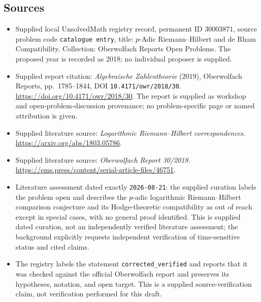 \documentclass[11pt]{article}
\begin{document}
\subsection{Sources}
\begin{itemize}
\item Supplied local UnsolvedMath registry record, permanent ID \(30003871\), source problem code \texttt{catalogue entry}, title: \(p\)-Adic Riemann--Hilbert and de Rham Compatibility. Collection: Oberwolfach Reports Open Problems. The proposed year is recorded as 2018; no individual proposer is supplied.
\item Supplied report citation: \emph{Algebraische Zahlentheorie} (2019), Oberwolfach Reports, pp.\ 1785--1844, DOI \texttt{10.4171/owr/2018/30}. \url{https://doi.org/10.4171/owr/2018/30}. The report is supplied as workshop and open-problem-discussion provenance; no problem-specific page or named attribution is given.
\item Supplied literature source: \emph{Logarithmic Riemann--Hilbert correspondences}. \url{https://arxiv.org/abs/1803.05786}.
\item Supplied literature source: \emph{Oberwolfach Report 30/2018}. \url{https://ems.press/content/serial-article-files/46751}.
\item Literature assessment dated exactly \texttt{2026-08-21}: the supplied curation labels the problem open and describes the \(p\)-adic logarithmic Riemann--Hilbert comparison conjecture and its Hodge-theoretic compatibility as out of reach except in special cases, with no general proof identified. This is supplied dated curation, not an independently verified literature assessment; the background explicitly requests independent verification of time-sensitive status and cited claims.
\item The registry labels the statement \texttt{corrected\_verified} and reports that it was checked against the official Oberwolfach report and preserves its hypotheses, notation, and open target. This is a supplied source-verification claim, not verification performed for this draft.
\end{itemize}
\end{document}
